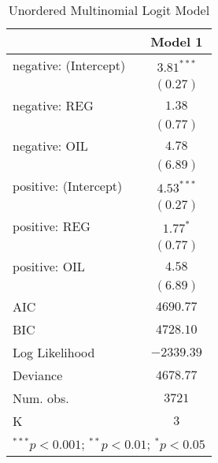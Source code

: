 \documentclass{article}
\begin{document}
\begin{table} [H]
\begin{center}
\begin{tabular}{l c}
\hline
 & Model 1 \\
\hline
negative: (Intercept) & $3.81^{***}$ \\
                      & $(0.27)$     \\
negative: REG         & $1.38$       \\
                      & $(0.77)$     \\
negative: OIL         & $4.78$       \\
                      & $(6.89)$     \\
positive: (Intercept) & $4.53^{***}$ \\
                      & $(0.27)$     \\
positive: REG         & $1.77^{*}$   \\
                      & $(0.77)$     \\
positive: OIL         & $4.58$       \\
                      & $(6.89)$     \\
\hline
AIC                   & $4690.77$    \\
BIC                   & $4728.10$    \\
Log Likelihood        & $-2339.39$   \\
Deviance              & $4678.77$    \\
Num. obs.             & $3721$       \\
K                     & $3$          \\
\hline
\multicolumn{2}{l}{\scriptsize{$^{***}p<0.001$; $^{**}p<0.01$; $^{*}p<0.05$}}
\end{tabular}
\caption{Unordered Multinomial Logit Model}
\label{table:coefficients}
\end{center}
\end{table}
\end{document}

